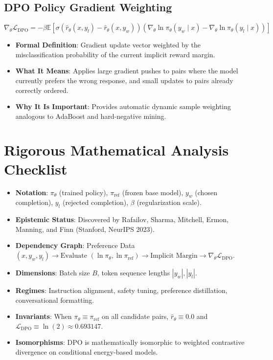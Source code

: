 \documentclass[11pt,a4paper]{article}
\theoremstyle{definition}
\begin{document}
\subsection{DPO Policy Gradient Weighting}
{\boldmath
\begin{equation}
\nabla_\theta \mathcal{L}_{\text{DPO}} = - \beta \mathbb{E}\left[ \sigma(\hat{r}_\theta(x, y_l) - \hat{r}_\theta(x, y_w)) \left( \nabla_\theta \ln \pi_\theta(y_w \mid x) - \nabla_\theta \ln \pi_\theta(y_l \mid x) \right) \right]
\end{equation}
}
\begin{itemize}
    \item \textbf{Formal Definition}: Gradient update vector weighted by the misclassification probability of the current implicit reward margin.
    \item \textbf{What It Means}: Applies large gradient pushes to pairs where the model currently prefers the wrong response, and small updates to pairs already correctly ordered.
    \item \textbf{Why It Is Important}: Provides automatic dynamic sample weighting analogous to AdaBoost and hard-negative mining.
\end{itemize}

\section{Rigorous Mathematical Analysis Checklist}

\begin{itemize}
    \item \textbf{Notation}: $\pi_\theta$ (trained policy), $\pi_{\text{ref}}$ (frozen base model), $y_w$ (chosen completion), $y_l$ (rejected completion), $\beta$ (regularization scale).
    \item \textbf{Epistemic Status}: Discovered by Rafailov, Sharma, Mitchell, Ermon, Manning, and Finn (Stanford, NeurIPS 2023).
    \item \textbf{Dependency Graph}: Preference Data $(x, y_w, y_l) \to \text{Evaluate } (\ln \pi_\theta, \ln \pi_{\text{ref}}) \to \text{Implicit Margin} \to \nabla_\theta \mathcal{L}_{\text{DPO}}$.
    \item \textbf{Dimensions}: Batch size $B$, token sequence lengths $|y_w|, |y_l|$.
    \item \textbf{Regimes}: Instruction alignment, safety tuning, preference distillation, conversational formatting.
    \item \textbf{Invariants}: When $\pi_\theta \equiv \pi_{\text{ref}}$ on all candidate pairs, $\hat{r}_\theta \equiv 0.0$ and $\mathcal{L}_{\text{DPO}} \equiv \ln(2) \approx 0.693147$.
    \item \textbf{Isomorphisms}: DPO is mathematically isomorphic to weighted contrastive divergence on conditional energy-based models.
\end{itemize}
\end{document}
